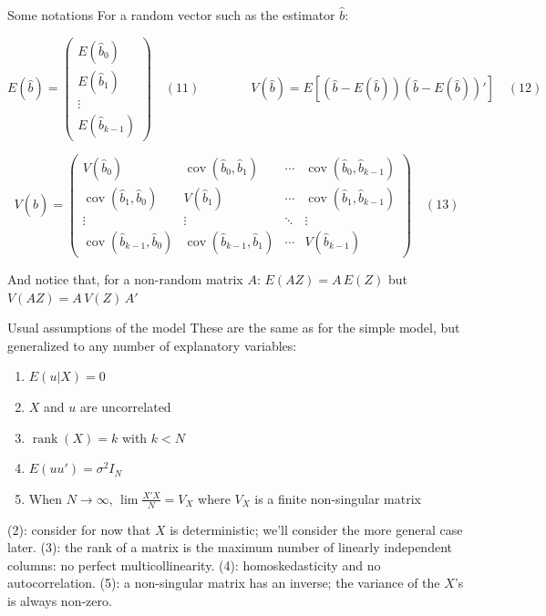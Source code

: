 \documentclass[aspectratio=169]{beamer}
\begin{document}
\begin{frame}{Some notations}
For a random vector such as the estimator $\hat{b}$:

\[E(\hat{b}) = \begin{pmatrix} E(\hat{b}_0) \\ E(\hat{b}_1) \\ \vdots \\ E(\hat{b}_{k-1}) \end{pmatrix} \quad (11) \qquad\qquad V(\hat{b}) = E[(\hat{b} - E(\hat{b}))(\hat{b} - E(\hat{b}))'] \quad (12)\]

\[V(\hat{b}) = \begin{pmatrix} V(\hat{b}_0) & \operatorname{cov}(\hat{b}_0, \hat{b}_1) & \cdots & \operatorname{cov}(\hat{b}_0, \hat{b}_{k-1}) \\ \operatorname{cov}(\hat{b}_1, \hat{b}_0) & V(\hat{b}_1) & \cdots & \operatorname{cov}(\hat{b}_1, \hat{b}_{k-1}) \\ \vdots & \vdots & \ddots & \vdots \\ \operatorname{cov}(\hat{b}_{k-1}, \hat{b}_0) & \operatorname{cov}(\hat{b}_{k-1}, \hat{b}_1) & \cdots & V(\hat{b}_{k-1}) \end{pmatrix} \quad (13)\]

And notice that, for a non-random matrix $A$: $E(AZ) = A\,E(Z)$ but $V(AZ) = A\,V(Z)\,A'$
\end{frame}

\begin{frame}{Usual assumptions of the model}
These are the same as for the simple model, but generalized to any number of explanatory variables:

\begin{enumerate}
    \item $E(u|X) = 0$
    \item $X$ and $u$ are uncorrelated
    \item $\operatorname{rank}(X) = k$ with $k < N$
    \item $E(uu') = \sigma^2I_N$
    \item When $N \to \infty$, $\lim\frac{X'X}{N} = V_X$ where $V_X$ is a finite non-singular matrix
\end{enumerate}

(2): consider for now that $X$ is deterministic; we'll consider the more general case later. (3): the rank of a matrix is the maximum number of linearly independent columns: no perfect multicollinearity. (4): homoskedasticity and no autocorrelation. (5): a non-singular matrix has an inverse; the variance of the $X$'s is always non-zero.
\end{frame}
\end{document}
